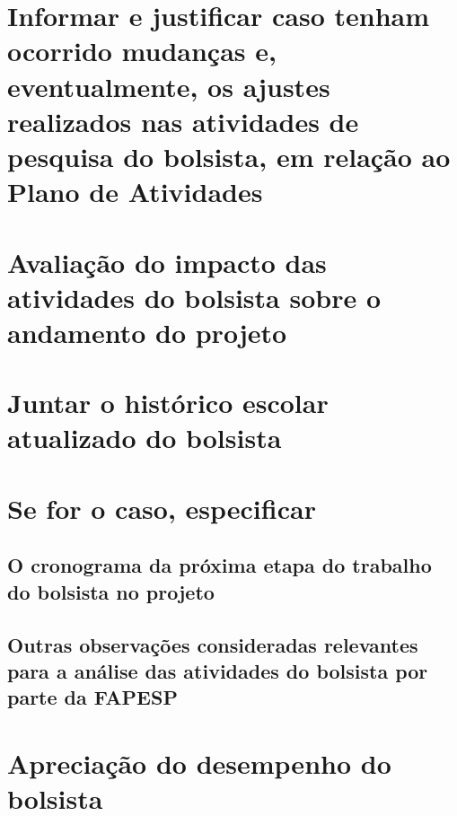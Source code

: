 \documentclass[a4paper, 11pt]{article}
\begin{document}
\section*{Informar e justificar caso tenham ocorrido mudanças e, eventualmente, os ajustes realizados nas atividades de pesquisa do bolsista, em relação ao Plano de Atividades}
\section*{Avaliação do impacto das atividades do bolsista sobre o andamento do projeto}
\section*{Juntar o histórico escolar atualizado do bolsista}
\section*{Se for o caso, especificar}
\subsection*{O cronograma da próxima etapa do trabalho do bolsista no projeto}
\subsection*{Outras observações consideradas relevantes para a análise das atividades do bolsista por parte da FAPESP}

\section*{Apreciação do desempenho do bolsista}
\end{document}
